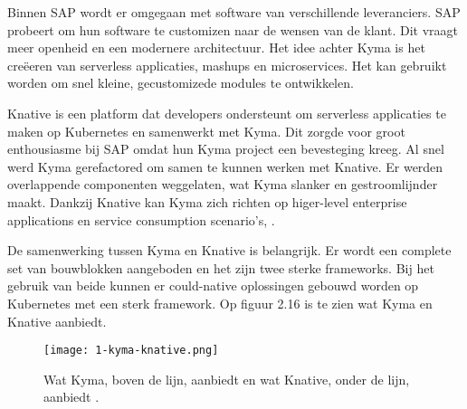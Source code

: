 Binnen SAP wordt er omgegaan met software van verschillende leveranciers. SAP probeert om hun software te customizen naar de  wensen van de klant. Dit vraagt meer openheid en een modernere architectuur. 
Het idee achter Kyma is het creëeren van serverless applicaties, mashups en microservices. Het kan  gebruikt worden om snel kleine, gecustomizede modules te ontwikkelen. 

Knative is een platform dat developers ondersteunt om serverless applicaties te maken op Kubernetes en samenwerkt met Kyma. Dit zorgde voor groot enthousiasme bij SAP omdat hun Kyma project een bevesteging kreeg. Al snel  werd Kyma gerefactored om samen te kunnen  werken met Knative. Er werden overlappende componenten  weggelaten, wat Kyma slanker en gestroomlijnder maakt. Dankzij Knative kan Kyma zich richten op higer-level enterprise applications en service consumption scenario's, \textcite{Semerdzhiev2018}.

De samenwerking tussen Kyma en Knative is belangrijk. Er wordt een complete set van bouwblokken aangeboden en het zijn twee sterke frameworks. Bij het gebruik van beide kunnen er could-native oplossingen gebouwd worden op Kubernetes met een sterk framework. Op figuur 2.16 is te zien wat Kyma en Knative aanbiedt. \textcite{Hofmann2018}
\begin{figure}[h!]
	\texttt{[image: 1-kyma-knative.png]}
	\caption{Wat Kyma, boven de lijn, aanbiedt en wat Knative, onder de lijn, aanbiedt \textcite{Hofmann2018}.}
	\centering
\end{figure}


